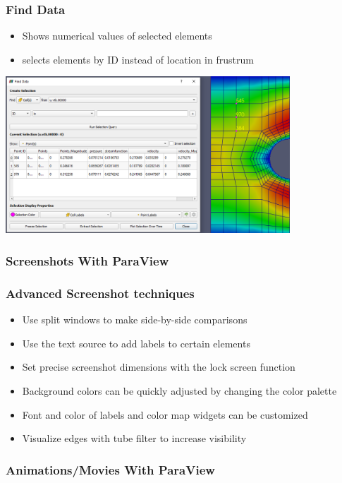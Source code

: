 \begin{frame}
  \frametitle{Find Data}
    \begin{itemize}
      \item Shows numerical values of selected elements
      \item {} selects elements by ID instead of location in frustrum
    \end{itemize}
		\begin{center}
      \includegraphics[width=0.8\textwidth]{screenshots/find-data.png}					
		\end{center}
\end{frame}

\begin{frame}
  \frametitle{Screenshots With ParaView}
\end{frame}

\begin{frame}
  \frametitle{Advanced Screenshot techniques}
    \begin{itemize}
      \item Use split windows to make side-by-side comparisons
      \item Use the text source to add labels to certain elements
      \item Set precise screenshot dimensions with the lock screen function
      \item Background colors can be quickly adjusted by changing the color palette
      \item Font and color of labels and color map widgets can be customized
      \item Visualize edges with tube filter to increase visibility
    \end{itemize}
\end{frame}

\begin{frame}
  \frametitle{Animations/Movies With ParaView}
\end{frame}

